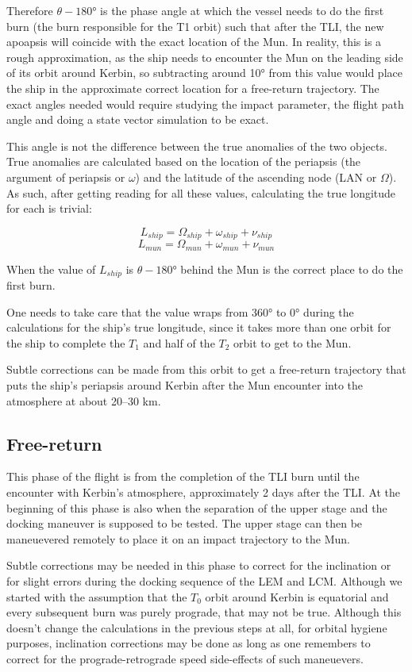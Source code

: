 \documentclass[11pt, a4paper]{article}
\begin{document}
Therefore $\theta - \ang{180}$ is the phase angle at which the vessel needs to do
the first burn (the burn responsible for the T1 orbit) such that after
the TLI, the new apoapsis will coincide with the exact location of the
Mun. In reality, this is a rough approximation, as the ship needs to
encounter the Mun on the leading side of its orbit around Kerbin, so
subtracting around \ang{10} from this value would place the ship in
the approximate correct location for a free-return trajectory. The
exact angles needed would require studying the impact parameter, the
flight path angle and doing a state vector simulation to be exact.

This angle is not the difference between the true anomalies of the two
objects. True anomalies are calculated based on the location of the
periapsis (the argument of periapsis or $\omega$) and the latitude of
the ascending node (LAN or $\Omega$). As such, after getting reading
for all these values, calculating the true longitude for each is
trivial:

\[ L_{ship} = \Omega_{ship} + \omega_{ship} + \nu_{ship} \]
\[ L_{mun} = \Omega_{mun} + \omega_{mun} + \nu_{mun} \]

When the value of $L_{ship}$ is $\theta - \ang{180}$ behind the Mun is
the correct place to do the first burn.

One needs to take care that the value wraps from \ang{360} to
\ang{0} during the calculations for the ship's true longitude, since
it takes more than one orbit for the ship to complete the $T_1$ and
half of the $T_2$ orbit to get to the Mun.

Subtle corrections can be made from this orbit to get a free-return
trajectory that puts the ship's periapsis around Kerbin after the Mun
encounter into the atmosphere at about 20--30 km.

\subsection{Free-return}

This phase of the flight is from the completion of the TLI burn until
the encounter with Kerbin's atmosphere, approximately 2 days after the
TLI. At the beginning of this phase is also when the separation of the
upper stage and the docking maneuver is supposed to be tested. The
upper stage can then be maneuevered remotely to place it on an impact
trajectory to the Mun.

Subtle corrections may be needed in this phase to correct for the
inclination or for slight errors during the docking sequence of the
LEM and LCM. Although we started with the assumption that the $T_0$ orbit
around Kerbin is equatorial and every subsequent burn was purely
prograde, that may not be true. Although this doesn't change the
calculations in the previous steps at all, for orbital hygiene
purposes, inclination corrections may be done as long as one remembers
to correct for the prograde-retrograde speed side-effects of such
maneuevers.
\end{document}
